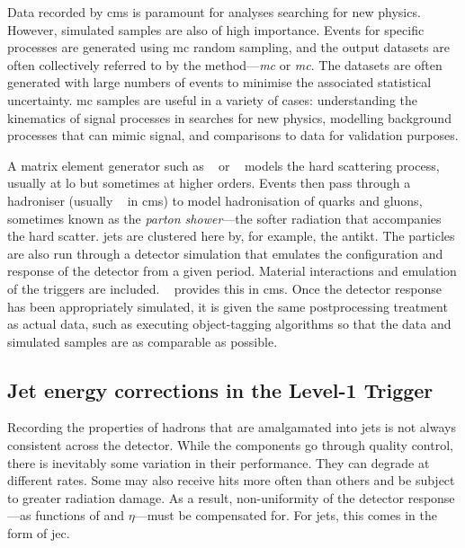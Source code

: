 Data recorded by \acrshort{cms} is paramount for analyses searching for new physics. However, simulated samples are also of high importance. Events for specific processes are generated using \acrfull{mc} random sampling, and the output datasets are often collectively referred to by the method---\emph{\acrlong{mc}} or \emph{\acrshort{mc}}. The datasets are often generated with large numbers of events to minimise the associated statistical uncertainty. \acrshort{mc} samples are useful in a variety of cases: understanding the kinematics of signal processes in searches for new physics, modelling background processes that can mimic signal, and comparisons to data for validation purposes.

A matrix element generator such as \madgraph~\cite{Alwall:2014hca} or \POWHEG~\cite{Nason:2004rx,Frixione:2007vw} models the hard scattering process, usually at \acrfull{lo} but sometimes at higher orders. Events then pass through a hadroniser (usually \PYTHIA~\cite{pythia82} in \acrshort{cms}) to model hadronisation of quarks and gluons, sometimes known as the \emph{parton shower}---the softer radiation that accompanies the hard scatter. \Glspl{jet} are clustered here by, for example, the \gls{antikt}. The particles are also run through a detector simulation that emulates the configuration and response of the detector from a given period. Material interactions and emulation of the triggers are included. \GEANTfour~\cite{AGOSTINELLI2003250} provides this in \acrshort{cms}. Once the detector response has been appropriately simulated, it is given the same postprocessing treatment as actual data, such as executing object-tagging algorithms so that the data and simulated samples are as comparable as possible.




\subsection{Jet energy corrections in the Level-1 Trigger}
\label{subsec:detector_jecs}

Recording the properties of hadrons that are amalgamated into \glspl{jet} is not always consistent across the detector. While the components go through quality control, there is inevitably some variation in their performance. They can degrade at different rates. Some may also receive hits more often than others and be subject to greater radiation damage. As a result, non-uniformity of the detector response---as functions of \pt and $\eta$---must be compensated for. For \glspl{jet}, this comes in the form of \gls{jec}.

